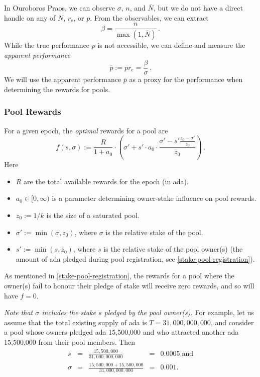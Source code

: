 \documentclass[11pt,a4paper,dvipsnames,twosided]{article}
\newcommand\pbar{\overline{p}}
\newcommand\Nbar{\overline{N}}
\begin{document}
In Ouroboros Praos, we can observe \(\sigma\), \(n\), and \(\Nbar\), but
we do not have a direct handle on any of \(N\), \(r_e\), or \(p\). From the
observables, we can extract
\begin{equation}
  \beta = \frac{n}{\max(1, \Nbar)}\,.
  \label{eq:beta}
\end{equation}
While the true performance \(p\) is not accessible, we can define and measure
the \emph{apparent performance}
\[
\pbar := p r_e = \frac{\beta}{\sigma}\,.
\]
We will use the apparent performance \(\pbar\) as a proxy for the performance
when determining the rewards for pools.

\subsubsection{Pool Rewards}
\label{pool-rewards}

For a given epoch, the \emph{optimal} rewards for a pool are
\begin{equation}
  f(s,\sigma) :=
  \frac{R}{1 + a_0}
  \cdot
  \left(\sigma' + s'\cdot a_0\cdot\frac{\sigma' -
    s'\frac{z_0-\sigma'}{z_0}}{z_0}\right)\,.
  \label{eq:optimal-rewards}
\end{equation}
Here

\begin{itemize}
\item
  \(R\) are the total available rewards for the epoch (in ada).
\item
  \(a_0\in[0,\infty)\) is a parameter determining owner-stake influence on pool
    rewards.
\item
  \(z_0:=1/k\) is the size of a saturated pool.
\item
  \(\sigma':=\min(\sigma, z_0)\), where \(\sigma\) is the relative stake
  of the pool.
\item
  \(s':=\min(s, z_0)\), where \(s\) is the relative stake of the pool
  owner(s) (the amount of ada pledged during pool registration,
  see \cref{stake-pool-registration}).
\end{itemize}

As mentioned in \cref{stake-pool-registration}, the rewards for a pool
where the owner(s) fail to honour their pledge of stake will receive
zero rewards, and so will have $f=0$.

\emph{Note that \(\sigma\) includes the stake \(s\) pledged by the pool
owner(s).} For example, let us assume that the total existing supply of
ada is \(T=31,000,000,000\), and consider a pool whose owners
pledged ada 15,500,000 and who attracted another ada 15,500,000 from their
pool members. Then \[
\begin{array}{rcccl}
    s                  & = & \displaystyle\frac{15,500,000}{31,000,000,000}              & = & 0.0005\;\text{and} \\[5mm]
    \sigma & = & \displaystyle\frac{15,500,000 + 15,500,000}{31,000,000,000} & = & 0.001. \\
\end{array}
\]
\end{document}
